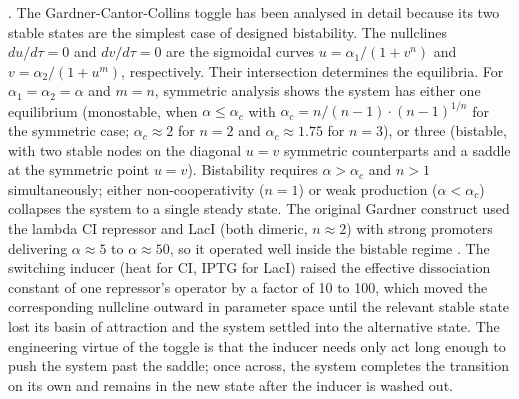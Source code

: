 . The Gardner-Cantor-Collins
toggle has been analysed in detail because its two stable states are
the simplest case of designed bistability. The nullclines
$du/d\tau = 0$ and $dv/d\tau = 0$ are the sigmoidal curves
$u = \alpha_{1}/(1 + v^{n})$ and $v = \alpha_{2}/(1 + u^{m})$,
respectively. Their intersection determines the equilibria. For
$\alpha_{1} = \alpha_{2} = \alpha$ and $m = n$, symmetric analysis
shows the system has either one equilibrium (monostable, when
$\alpha \le \alpha_{c}$ with $\alpha_{c} = n/(n-1) \cdot (n-1)^{1/n}$
for the symmetric case; $\alpha_{c} \approx 2$ for $n = 2$ and
$\alpha_{c} \approx 1.75$ for $n = 3$), or three (bistable, with
two stable nodes on the diagonal $u = v$ symmetric counterparts and
a saddle at the symmetric point $u = v$). Bistability requires
$\alpha > \alpha_{c}$ and $n > 1$ simultaneously; either
non-cooperativity ($n = 1$) or weak production ($\alpha < \alpha_{c}$)
collapses the system to a single steady state. The original
Gardner construct used the lambda CI repressor and LacI (both
dimeric, $n \approx 2$) with strong promoters delivering
$\alpha \approx 5$ to $\alpha \approx 50$, so it operated well inside
the bistable regime
\cite[pp.~340--341]{paper:v6c09-gardner-toggle-2000}. The switching
inducer (heat for CI, IPTG for LacI) raised the effective dissociation
constant of one repressor's operator by a factor of 10 to 100, which
moved the corresponding nullcline outward in parameter space until
the relevant stable state lost its basin of attraction and the
system settled into the alternative state. The engineering virtue
of the toggle is that the inducer needs only act long enough to push
the system past the saddle; once across, the system completes the
transition on its own and remains in the new state after the
inducer is washed out.

